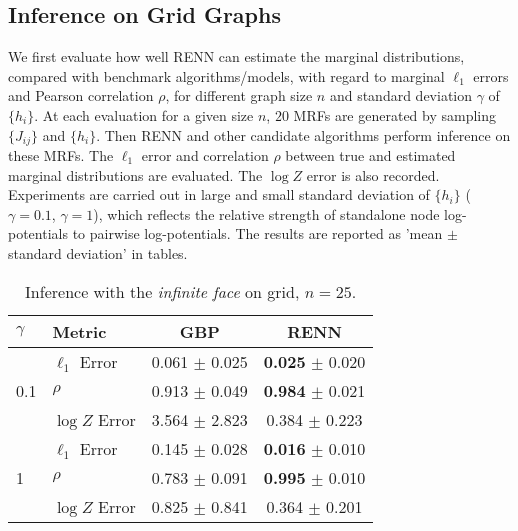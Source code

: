 \subsection{Inference on Grid Graphs}

We first evaluate how well RENN can estimate the marginal distributions, compared with benchmark algorithms/models, with regard to marginal $\ell_1$ errors and Pearson correlation $\rho$, for different graph size $n$ and standard deviation $\gamma$ of $\{h_i\}$. At each evaluation for a given size $n$, $20$ MRFs are generated by sampling $\{J_{ij}\}$ and $\{h_i\}$. Then RENN and other candidate algorithms perform inference on these MRFs. The $\ell_1$ error and correlation $\rho$ between true and estimated marginal distributions are evaluated. The $\log{Z}$ error is also recorded.
Experiments are carried out in large and small standard deviation of $\{h_i\}$ ($\gamma=0.1$, $\gamma=1$), which reflects the relative strength of standalone node log-potentials to pairwise log-potentials. The results are reported as 'mean $\pm$ standard deviation' in tables.

\begin{table}[tp!]
  \caption{Inference with the \textit{infinite face} on grid, $n=25$.}
  \label{tab:infer-infinite-face}
  \begin{center}
    \begin{small}
      
      \begin{tabular}{llcc}
        \toprule
        $\gamma$ & Metric & GBP & RENN \\
        \midrule
        \multirow{3}{*}{0.1}
                 & $\ell_1$ Error & 0.061 $\pm$ 0.025 & \textbf{0.025} $\pm$ 0.020 \\

                 & $\rho$   & 0.913 $\pm$ 0.049  &  \textbf{0.984} $\pm$ 0.021  \\
                 & $\log{Z}$ Error & 3.564 $\pm$ 2.823  &  0.384 $\pm$ 0.223  \\
        \midrule
        \multirow{3}{*}{1}
                 & $\ell_1$ Error & 0.145 $\pm$ 0.028  & \textbf{0.016} $\pm$ 0.010 \\

                 & $\rho$   & 0.783 $\pm$ 0.091  &  \textbf{0.995} $\pm$ 0.010 \\
                 & $\log{Z}$ Error & 0.825 $\pm$ 0.841  & 0.364 $\pm$ 0.201 \\
        
        \bottomrule
      \end{tabular}

    \end{small}
  \end{center}
\end{table}








